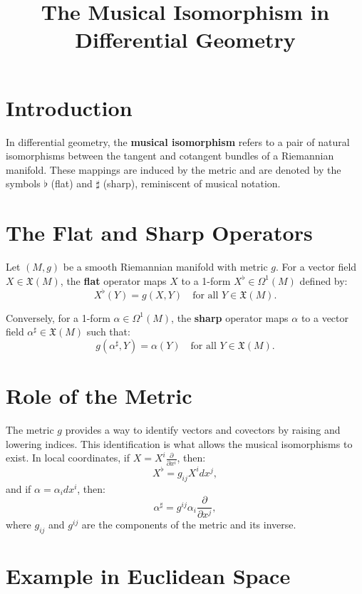 \documentclass{article}
\title{The Musical Isomorphism in Differential Geometry}
\author{}
\date{}
\begin{document}
	
	\maketitle
	
	\section*{Introduction}
	
	In differential geometry, the \textbf{musical isomorphism} refers to a pair of natural isomorphisms between the tangent and cotangent bundles of a Riemannian manifold. These mappings are induced by the metric and are denoted by the symbols \(\flat\) (flat) and \(\sharp\) (sharp), reminiscent of musical notation.
	
	\section*{The Flat and Sharp Operators}
	
	Let \( (M, g) \) be a smooth Riemannian manifold with metric \( g \). For a vector field \( X \in \mathfrak{X}(M) \), the \textbf{flat} operator maps \( X \) to a 1-form \( X^\flat \in \Omega^1(M) \) defined by:
	\[
	X^\flat(Y) = g(X, Y) \quad \text{for all } Y \in \mathfrak{X}(M).
	\]
	
	Conversely, for a 1-form \( \alpha \in \Omega^1(M) \), the \textbf{sharp} operator maps \( \alpha \) to a vector field \( \alpha^\sharp \in \mathfrak{X}(M) \) such that:
	\[
	g(\alpha^\sharp, Y) = \alpha(Y) \quad \text{for all } Y \in \mathfrak{X}(M).
	\]
	
	\section*{Role of the Metric}
	
	The metric \( g \) provides a way to identify vectors and covectors by raising and lowering indices. This identification is what allows the musical isomorphisms to exist. In local coordinates, if \( X = X^i \frac{\partial}{\partial x^i} \), then:
	\[
	X^\flat = g_{ij} X^i dx^j,
	\]
	and if \( \alpha = \alpha_i dx^i \), then:
	\[
	\alpha^\sharp = g^{ij} \alpha_i \frac{\partial}{\partial x^j},
	\]
	where \( g_{ij} \) and \( g^{ij} \) are the components of the metric and its inverse.
	
	\section*{Example in Euclidean Space}
	
\end{document}
